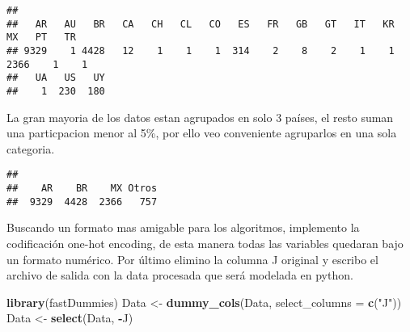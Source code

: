 \documentclass[]{article}
\newenvironment{Shaded}{\begin{snugshade}}{\end{snugshade}}
\newcommand{\CommentTok}[1]{\textcolor[rgb]{0.56,0.35,0.01}{\textit{#1}}}
\newcommand{\DataTypeTok}[1]{\textcolor[rgb]{0.13,0.29,0.53}{#1}}
\newcommand{\KeywordTok}[1]{\textcolor[rgb]{0.13,0.29,0.53}{\textbf{#1}}}
\newcommand{\NormalTok}[1]{#1}
\newcommand{\OperatorTok}[1]{\textcolor[rgb]{0.81,0.36,0.00}{\textbf{#1}}}
\newcommand{\StringTok}[1]{\textcolor[rgb]{0.31,0.60,0.02}{#1}}
\begin{document}
\begin{verbatim}
## 
##   AR   AU   BR   CA   CH   CL   CO   ES   FR   GB   GT   IT   KR   MX   PT   TR 
## 9329    1 4428   12    1    1    1  314    2    8    2    1    1 2366    1    1 
##   UA   US   UY 
##    1  230  180
\end{verbatim}

La gran mayoria de los datos estan agrupados en solo 3 países, el resto
suman una particpacion menor al 5\%, por ello veo conveniente agruparlos
en una sola categoria.

\begin{Shaded}
\end{Shaded}

\begin{verbatim}
## 
##    AR    BR    MX Otros 
##  9329  4428  2366   757
\end{verbatim}

Buscando un formato mas amigable para los algoritmos, implemento la
codificación one-hot encoding, de esta manera todas las variables
quedaran bajo un formato numérico. Por último elimino la columna J
original y escribo el archivo de salida con la data procesada que será
modelada en python.

\begin{Shaded}
\begin{Highlighting}[]
\KeywordTok{library}\NormalTok{(fastDummies)}
\NormalTok{Data <-}\StringTok{ }\KeywordTok{dummy_cols}\NormalTok{(Data, }\DataTypeTok{select_columns =} \KeywordTok{c}\NormalTok{(}\StringTok{"J"}\NormalTok{))}
\NormalTok{Data <-}\StringTok{ }\KeywordTok{select}\NormalTok{(Data, }\OperatorTok{-}\NormalTok{J)}
\end{Highlighting}
\end{Shaded}
\end{document}
